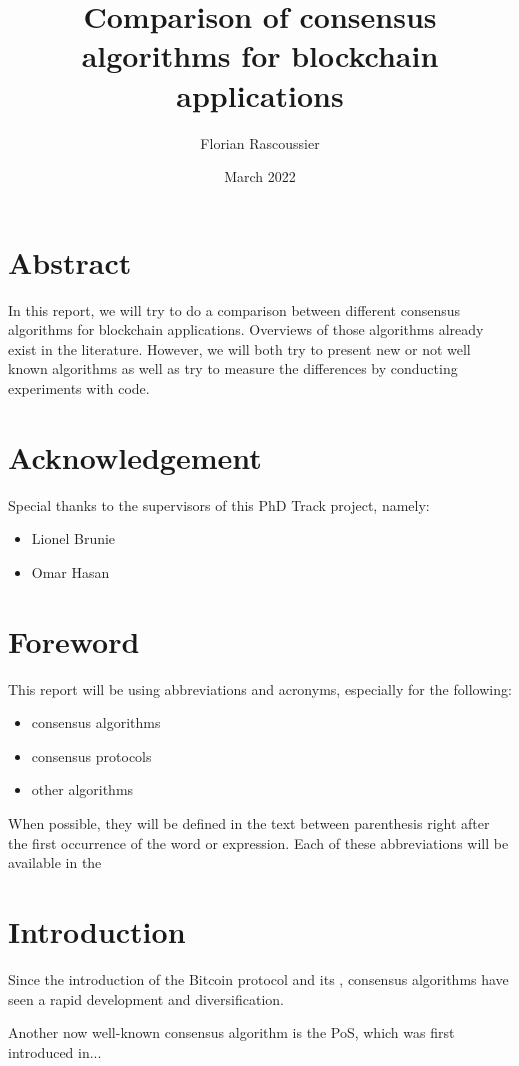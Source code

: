 \documentclass[12pt]{article} %
\title{Comparison of consensus algorithms for blockchain applications}
\author{Florian Rascoussier}
\date{March 2022}
\begin{document}

\newpage


\newpage

\section{Abstract}
In this report, we will try to do a comparison between different consensus 
algorithms for blockchain applications. Overviews of those algorithms 
already exist in the literature. However, we will both try to present
new or not well known algorithms as well as try to measure the 
differences by conducting experiments with code.

\section{Acknowledgement}
Special thanks to the supervisors of this PhD Track project, namely:
\begin{itemize}
    \item Lionel Brunie
    \item Omar Hasan
\end{itemize}

\section{Foreword}
This report will be using abbreviations and acronyms, especially for the following:
\begin{itemize}
    \item consensus algorithms
    \item consensus protocols
    \item other algorithms
\end{itemize}
When possible, they will be defined in the text between parenthesis right after 
the first occurrence of the word or expression. Each of these abbreviations will 
be available in the 

\newpage
\tableofcontents

\newpage
{} %

\section{Introduction}
Since the introduction of the Bitcoin protocol and its 
 \cite{Nakamoto2009-uw}, consensus algorithms have 
seen a rapid development and diversification. 

Another now well-known consensus algorithm is the \acrlong{PoS}, which
was first introduced in...
\end{document}
